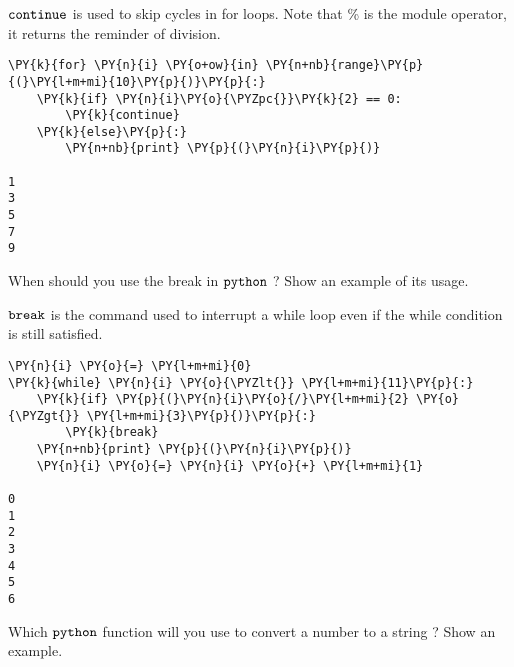 \begin{Answer}
\(\tt{continue}\) is used to skip cycles in for loops. Note that \% is
the module operator, it returns the reminder of division.

\begin{tcolorbox}[size=fbox, boxrule=1pt, colback=cellbackground, colframe=cellborder]
\begin{Verbatim}[commandchars=\\\{\}]
\PY{k}{for} \PY{n}{i} \PY{o+ow}{in} \PY{n+nb}{range}\PY{p}{(}\PY{l+m+mi}{10}\PY{p}{)}\PY{p}{:}
    \PY{k}{if} \PY{n}{i}\PY{o}{\PYZpc{}}\PY{k}{2} == 0:
        \PY{k}{continue}
    \PY{k}{else}\PY{p}{:}
        \PY{n+nb}{print} \PY{p}{(}\PY{n}{i}\PY{p}{)}

1
3
5
7
9
\end{Verbatim}
\end{tcolorbox}
\end{Answer}

\begin{Exercise}
When should you use the break in \(\tt{python}\) ? Show an example of its usage.
\end{Exercise}

\begin{Answer}
\(\tt{break}\) is the command used to interrupt a while loop even if the
while condition is still satisfied.

\begin{tcolorbox}[size=fbox, boxrule=1pt, colback=cellbackground, colframe=cellborder]
\begin{Verbatim}[commandchars=\\\{\}]
\PY{n}{i} \PY{o}{=} \PY{l+m+mi}{0}
\PY{k}{while} \PY{n}{i} \PY{o}{\PYZlt{}} \PY{l+m+mi}{11}\PY{p}{:}
    \PY{k}{if} \PY{p}{(}\PY{n}{i}\PY{o}{/}\PY{l+m+mi}{2} \PY{o}{\PYZgt{}} \PY{l+m+mi}{3}\PY{p}{)}\PY{p}{:}
        \PY{k}{break}
    \PY{n+nb}{print} \PY{p}{(}\PY{n}{i}\PY{p}{)}
    \PY{n}{i} \PY{o}{=} \PY{n}{i} \PY{o}{+} \PY{l+m+mi}{1}

0
1
2
3
4
5
6
\end{Verbatim}
\end{tcolorbox}  
\end{Answer}

\begin{Exercise}
Which \(\tt{python}\) function will you use to convert a number to a string ? Show an example.
\end{Exercise}

